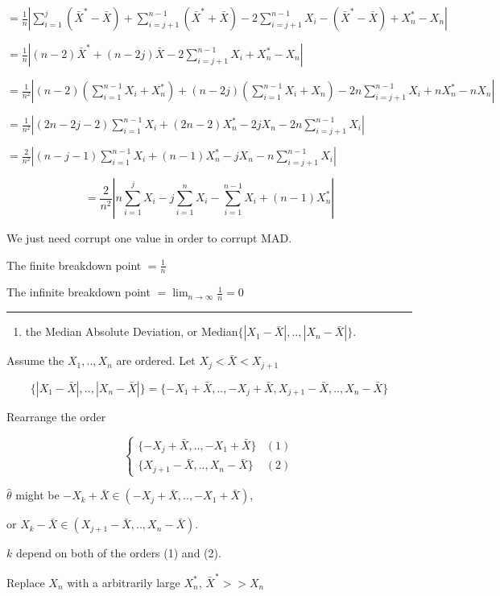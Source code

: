 \documentclass[12pt,]{article}
\providecommand{\tightlist}{%
  \setlength{\itemsep}{0pt}\setlength{\parskip}{0pt}}
\begin{document}
\(=\frac1n|\sum_{i=1}^{j}(\bar X^*-\bar X)+\sum_{i=j+1}^{n-1}(\bar X^*+\bar X)-2\sum_{i=j+1}^{n-1}X_i-(\bar X^*-\bar X)+X_n^*-X_n|\)

\(=\frac1n|(n-2)\bar X^*+(n-2j)\bar X-2\sum_{i=j+1}^{n-1}X_i+X_n^*-X_n|\)

\(=\frac1{n^2}|(n-2)(\sum_{i=1}^{n-1}X_i+X_n^*)+(n-2j)(\sum_{i=1}^{n-1}X_i+X_n)-2n\sum_{i=j+1}^{n-1}X_i+nX_n^*-nX_n|\)

\(=\frac1{n^2}|(2n-2j-2)\sum_{i=1}^{n-1}X_i+(2n-2)X_n^*-2jX_n-2n\sum_{i=j+1}^{n-1}X_i|\)

\(=\frac2{n^2}|(n-j-1)\sum_{i=1}^{n-1}X_i+(n-1)X_n^*-jX_n-n\sum_{i=j+1}^{n-1}X_i|\)

\[=\frac2{n^2}|n\sum_{i=1}^{j}X_i-j\sum_{i=1}^{n}X_i-\sum_{i=1}^{n-1}X_i+(n-1)X_n^*|\]

We just need corrupt one value in order to corrupt MAD.

The finite breakdown point \(=\frac{1}{n}\)

The infinite breakdown point \(=\lim_{n\to\infty}\frac1n=0\)

\begin{center}\rule{0.5\linewidth}{\linethickness}\end{center}

\begin{enumerate}
\def\labelenumi{\alph{enumi})}
\setcounter{enumi}{1}
\tightlist
\item
  the Median Absolute Deviation, or
  Median\(\{|X_1-\bar X|,..,|X_n-\bar X|\}\).
\end{enumerate}

Assume the \(X_1,..,X_n\) are ordered. Let \(X_j<\bar X<X_{j+1}\)

\[\{|X_1-\bar X|,..,|X_n-\bar X|\}=\{-X_1+\bar X,..,-X_j+\bar X,X_{j+1}-\bar X,..,X_n-\bar X\}\]

Rearrange the order

\[\begin{cases}\{-X_j+\bar X,..,-X_1+\bar X\}& (1)\\ \{X_{j+1}-\bar X,..,X_n-\bar X\}& (2)\end{cases}\]

\(\hat\theta\) might be \(-X_k+\bar X\in(-X_j+\bar X,..,-X_1+\bar X)\),

or \(X_k-\bar X\in(X_{j+1}-\bar X,..,X_n-\bar X)\).

\(k\) depend on both of the orders (1) and (2).

Replace \(X_{n}\) with a arbitrarily large \(X_n^*\), \(\bar X^*>>X_n\)
\end{document}
